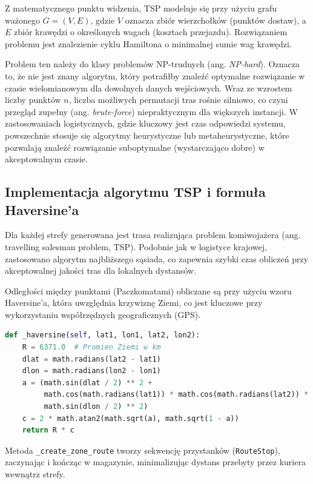 Z matematycznego punktu widzenia, TSP modeluje się przy użyciu grafu ważonego $G = (V, E)$, gdzie $V$ oznacza zbiór wierzchołków (punktów dostaw), a $E$ zbiór krawędzi o określonych wagach (kosztach przejazdu). Rozwiązaniem problemu jest znalezienie cyklu Hamiltona o minimalnej sumie wag krawędzi.

Problem ten należy do klasy problemów NP-trudnych (ang. \textit{NP-hard}). Oznacza to, że nie jest znany algorytm, który potrafiłby znaleźć optymalne rozwiązanie w czasie wielomianowym dla dowolnych danych wejściowych. Wraz ze wzrostem liczby punktów $n$, liczba możliwych permutacji tras rośnie silniowo, co czyni przegląd zupełny (ang. \textit{brute-force}) niepraktycznym dla większych instancji. W zastosowaniach logistycznych, gdzie kluczowy jest czas odpowiedzi systemu, powszechnie stosuje się algorytmy heurystyczne lub metaheurystyczne, które pozwalają znaleźć rozwiązanie suboptymalne (wystarczająco dobre) w akceptowalnym czasie.

\subsection{Implementacja algorytmu TSP i formuła Haversine'a}

Dla każdej strefy generowana jest trasa realizująca problem komiwojażera (ang. travelling salesman problem, TSP). Podobnie jak w logistyce krajowej, zastosowano algorytm najbliższego sąsiada, co zapewnia szybki czas obliczeń przy akceptowalnej jakości tras dla lokalnych dystansów.

Odległości między punktami (Paczkomatami) obliczane są przy użyciu wzoru Haversine'a, która uwzględnia krzywiznę Ziemi, co jest kluczowe przy wykorzystaniu współrzędnych geograficznych (GPS).

\begin{lstlisting}[language=Python, caption=Implementacja wzoru Haversine'a]
def _haversine(self, lat1, lon1, lat2, lon2):
    R = 6371.0  # Promien Ziemi w km
    dlat = math.radians(lat2 - lat1)
    dlon = math.radians(lon2 - lon1)
    a = (math.sin(dlat / 2) ** 2 +
         math.cos(math.radians(lat1)) * math.cos(math.radians(lat2)) *
         math.sin(dlon / 2) ** 2)
    c = 2 * math.atan2(math.sqrt(a), math.sqrt(1 - a))
    return R * c
\end{lstlisting}

Metoda \texttt{\_create\_zone\_route} tworzy sekwencję przystanków (\texttt{RouteStop}), zaczynając i kończąc w magazynie, minimalizując dystans przebyty przez kuriera wewnątrz strefy.

